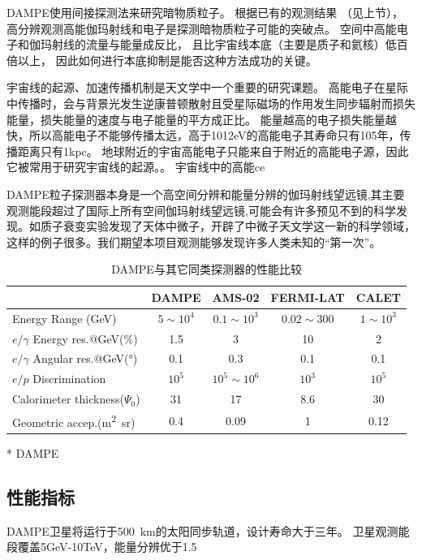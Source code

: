 DAMPE使用间接探测法来研究暗物质粒子。
根据已有的观测结果 （见上节）， 高分辨观测高能伽玛射线和电子是探测暗物质粒子可能的突破点。
空间中高能电子和伽玛射线的流量与能量成反比， 且比宇宙线本底（主要是质子和氦核）低百倍以上， 因此如何进行本底抑制是能否这种方法成功的关键。

宇宙线的起源、加速传播机制是天文学中一个重要的研究课题。
高能电子在星际中传播时，会与背景光发生逆康普顿散射且受星际磁场的作用发生同步辐射而损失能量，损失能量的速度与电子能量的平方成正比。
能量越高的电子损失能量越快，所以高能电子不能够传播太远，高于1012eV的高能电子其寿命只有105年，传播距离只有1kpc。
地球附近的宇宙高能电子只能来自于附近的高能电子源，因此它被常用于研究宇宙线的起源。。
宇宙线中的高能ce


DAMPE粒子探测器本身是一个高空间分辨和能量分辨的伽玛射线望远镜,其主要观测能段超过了国际上所有空间伽玛射线望远镜,可能会有许多预见不到的科学发现。如质子衰变实验发现了天体中微子，开辟了中微子天文学这一新的科学领域，这样的例子很多。我们期望本项目观测能够发现许多人类未知的“第一次”。

\begin{table}[htb]
	\centering
	\caption{DAMPE与其它同类探测器的性能比较}
	\label{tab:ch1:dampe_comparison}
	\begin{threeparttable}
	\begin{tabulary}{\linewidth}{LCCCC}
		\toprule[1.5pt]
		  & DAMPE & AMS-02 & FERMI-LAT & CALET \\ 
		\midrule[1pt]
		Energy Range (\si{GeV}) & $5\sim10^4$ & $0.1\sim10^3$ & $0.02\sim300$ & $1\sim10^3$ \\ 
		$e/\gamma$ Energy res.@\si{GeV}(\si{\percent}) & 1.5 & 3 & 10 & 2 \\ 
		$e/\gamma$ Angular res.@\si{GeV}(\si{\degree}) & 0.1 & 0.3 & 0.1 & 0.1 \\ 
		$e/p$ Discrimination& $10^5$ & $10^5\sim10^6$ & $10^3$ & $10^5$ \\ 
		Calorimeter thickness($\Psi_0$) & 31 & 17 & 8.6 & 30 \\ 
		Geometric accep.(\si{\meter\squared\steradian}) & 0.4 & 0.09 & 1 & 0.12\tnote{*} \\ 
		\bottomrule[1.5pt] 
	\end{tabulary}
	\begin{tablenotes}
		\item[*] DAMPE
	\end{tablenotes}
	\end{threeparttable}
\end{table}
    
\subsection{性能指标}
DAMPE卫星将运行于\SI{500}{\kilo\meter}的太阳同步轨道，设计寿命大于三年。
卫星观测能段覆盖5GeV-10TeV，能量分辨优于1.5%
